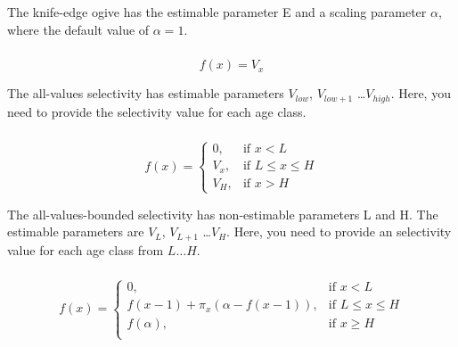 The knife-edge ogive has the estimable parameter E and a scaling parameter $\alpha$, where the default value of $\alpha = 1$.

\subsubsection[All-values]{}

\begin{equation}
f(x)=V_x
\end{equation}

The all-values selectivity has estimable parameters $V_{low}$, $V_{low+1}$ \ldots $V_{high}$. Here, you need to provide the selectivity value for each age class.

\subsubsection[All-values-bounded]{}

\begin{equation}
f(x)=\begin{cases}
		 0, & \text{if $x < L$} \\
		 V_x, & \text{if $L \le x \le H$} \\
		 V_H, & \text{if $x > H$}
  \end{cases}
\end{equation}

The all-values-bounded selectivity has non-estimable parameters L and H. The estimable parameters are $V_L$, $V_{L+1}$ \ldots $V_H$. Here, you need to provide an selectivity value for each age class from $L \ldots H$.

\subsubsection[Increasing]{}

\begin{equation} 
f(x)=\begin{cases}
	  0, & \text{if $x < L$} \\
	  f(x-1)+ \pi_x(\alpha-f(x-1)), & \text{if $L \le x \le H$} \\
	  f(\alpha), & \text{if $x \ge H$} \\  
  \end{cases}
\end{equation}


